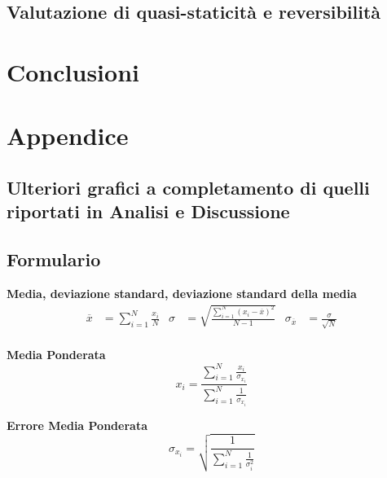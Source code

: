 \documentclass[a4paper,11pt,oneside]{article}
\begin{document}
\subsection{Valutazione di quasi-staticità e reversibilità}

\section{Conclusioni}

\newpage
\section{Appendice}
\subsection{Ulteriori grafici a completamento di quelli riportati in Analisi e Discussione}
\subsection{Formulario}
\textbf{Media, deviazione standard, deviazione standard della media}
\begin{align*}
        \overline{x}&=\sum\limits_{i=1}^{N} \frac{x_{i}}{N}&
        \sigma&=\sqrt{\frac{\sum\limits_{i=1}^{N} (x_{i}-\overline{x})^2}{N-1}}&
        \sigma_{\overline{x}}&=\frac{\sigma}{\sqrt{N}}
\end{align*}\\

\textbf{Media Ponderata}
\begin{equation*}
\label{eq:media_pond}
    x_i=\frac{\sum_{i=1}^{N}\frac{x_i}{\sigma_{x_i}}}{\sum_{i=1}^{N}\frac{1}{\sigma_{x_i}}}
\end{equation*}

\textbf{Errore Media Ponderata}
\begin{equation*}
\label{eq:errore_media_pond}
     \sigma_{x_i}=\sqrt{\frac{1}{\sum_{i=1}^{N}\frac{1}{\sigma_{i}^{2}}}}
\end{equation*}
\end{document}
